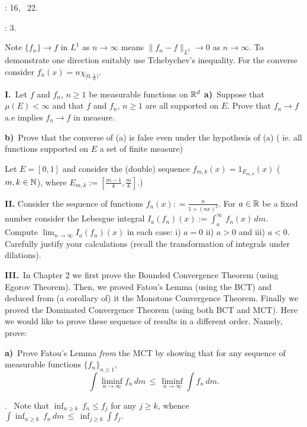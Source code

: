 {\bigskip
{}: 16, \, 22.

\smallskip

:  3. 

\smallskip

 Note $\{f_n\}  \to f$ in $L^1$ as $n\to \infty$  means $\| f_n - f\|_{L^1} \to 0$ as $n \to \infty$. To demonstrate one direction
 suitably use Tchebychev's inequality. For the converse consider $f_n(x) = n \chi_{[0, \frac{1}{n})}$.
\bigskip

\medskip

{\bf I.\,} Let  $f$ and $f_n$, $n \ge 1$ be measurable functions on $\Bbb R^d$
\smallskip
{\bf a)}\, Suppose that $\mu (E) < \infty$ and that  $f$ and $f_n$, $n \ge 1$ are all supported on $E$. 
Prove that $f_n \to f$ a.e implies $f_n \to f$ in measure. 
\smallskip

{\bf b)}\,  Prove that the converse of  (a) is false even under the hypothesis of (a)  ( ie. all functions supported on $E$ a set of finite measure)

 Let $E=[0,1]$ and consider  the (double) sequence 
$f_{m,k} (x) = 1_{E_{m,k}}(x)$ ($m,k \in \Bbb N$), where $E_{m,k}:= [ \frac{m-1}{k}, \frac{m}{k} ]$.)

\bigskip

{\bf II.} Consider the sequence of functions $f_n(x): = \frac{n}{1 +  (n x)^2}$.  For $a \in \Bbb R$ be a fixed number consider the Lebesgue integral $I_a(f_n)(x) := \int_a^\infty \, f_n(x)  \, dm$. Compute $\lim_{n \to \infty} I_a(f_n)(x)$ in each case: i) $a =0$  ii) $a > 0$  and iii) $a <0$. Carefully justify your calculations (recall the transformation of integrals under dilations). 
\bigskip

{\bf III.\,} In Chapter 2 we first prove the {Bounded Convergence Theorem} (using Egorov Theorem).
Then, we proved Fatou's Lemma (using the BCT) and
deduced from (a corollary of) it the Monotone Convergence Theorem. Finally we proved the Dominated 
Convergence Theorem (using both BCT and MCT). Here we would like to prove these sequence of results in a different order.
Namely, prove:

{\bf a)}\,  Prove Fatou's Lemma {\it from} the MCT by showing
that for any sequence of measurable functions $\{f_n\}_{n \geq 1}$, 
$$  \int  \liminf_{ n\to \infty}  f_n  \, dm \,  \leq  \,  \liminf_{ n\to \infty} \int f_n \, dm . $$

. \, Note that   $\inf_{ n \geq k} \,  f_n \leq f_j$ for any $ j \geq k$, whence  $\int \inf_{ n \geq k} \, f_n \, dm\,  \leq \, \inf_{j \geq k} \int  f_j.$ 
\medskip

}
